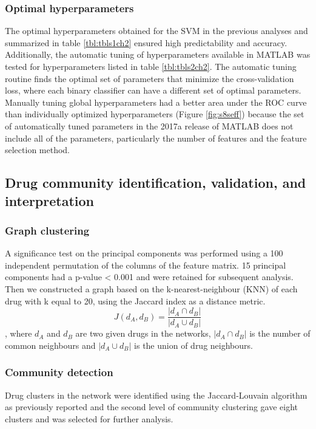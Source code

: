\subsubsection{Optimal hyperparameters}
The optimal hyperparameters obtained for the SVM in the previous analyses and summarized in table \ref{tbl:tbls1ch2} ensured high predictability and accuracy. Additionally, the automatic tuning of hyperparameters available in MATLAB was tested for hyperparameters listed in table \ref{tbl:tbls2ch2}. The automatic tuning routine finds the optimal set of parameters that minimize the cross-validation loss, where each binary classifier can have a different set of optimal parameters. Manually tuning global hyperparameters had a better area under the ROC curve than individually optimized hyperparameters (Figure \ref{fig:s8seff}) because the set of automatically tuned parameters in the 2017a release of MATLAB does not include all of the parameters, particularly the number of features and the feature selection method.
\subsection{Drug community identification, validation, and interpretation}
\subsubsection{Graph clustering}
A significance test on the principal components was performed using a 100 independent permutation of the columns of the feature matrix. 15 principal components had a p-value < 0.001 and were retained for subsequent analysis. Then we constructed a graph based on the k-nearest-neighbour (KNN) \cite{altman1992introduction} of each drug with k equal to 20, using the Jaccard index as a distance metric.
\begin{equation*}
J(d_A,d_B )=\frac{|d_A \cap d_B |}{|d_A \cup d_B |}
\end{equation*}
, where $d_A$ and $d_B$ are two given drugs in the networks, $|d_A \cap d_B |$ is the number of common neighbours and $|d_A \cup d_B |$ is the union of drug neighbours.
\subsubsection{Community detection}
Drug clusters in the network were identified using the Jaccard-Louvain algorithm \cite{blondel2008fast} as previously reported \cite{shekhar2016comprehensive} and the second level of community clustering gave eight clusters and was selected for further analysis. 
